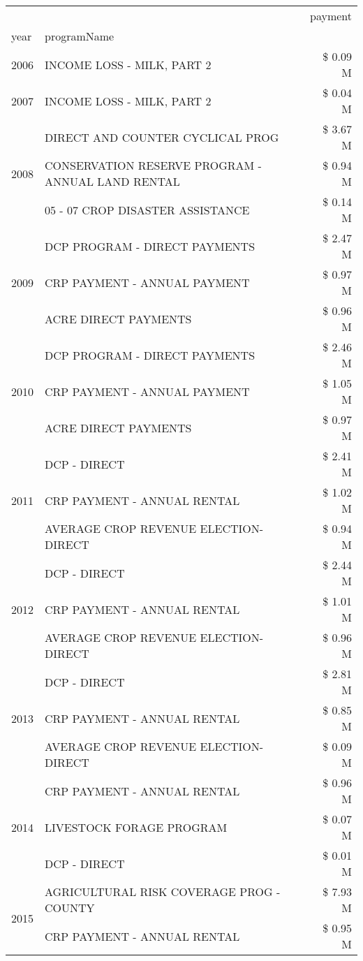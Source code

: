 \begin{tabular}{llr}
\toprule
 &  & payment \\
year & programName &  \\
\midrule
2006 & INCOME LOSS - MILK, PART 2 & \$ 0.09 M \\
\cline{1-3}
2007 & INCOME LOSS - MILK, PART 2 & \$ 0.04 M \\
\cline{1-3}
\multirow[t]{3}{*}{2008} & DIRECT AND COUNTER CYCLICAL PROG & \$ 3.67 M \\
 & CONSERVATION RESERVE PROGRAM - ANNUAL LAND RENTAL & \$ 0.94 M \\
 & 05 - 07 CROP DISASTER ASSISTANCE & \$ 0.14 M \\
\cline{1-3}
\multirow[t]{3}{*}{2009} & DCP PROGRAM - DIRECT PAYMENTS & \$ 2.47 M \\
 & CRP PAYMENT - ANNUAL PAYMENT & \$ 0.97 M \\
 & ACRE DIRECT PAYMENTS & \$ 0.96 M \\
\cline{1-3}
\multirow[t]{3}{*}{2010} & DCP PROGRAM - DIRECT PAYMENTS & \$ 2.46 M \\
 & CRP PAYMENT - ANNUAL PAYMENT & \$ 1.05 M \\
 & ACRE DIRECT PAYMENTS & \$ 0.97 M \\
\cline{1-3}
\multirow[t]{3}{*}{2011} & DCP - DIRECT & \$ 2.41 M \\
 & CRP PAYMENT - ANNUAL RENTAL & \$ 1.02 M \\
 & AVERAGE CROP REVENUE ELECTION-DIRECT & \$ 0.94 M \\
\cline{1-3}
\multirow[t]{3}{*}{2012} & DCP - DIRECT & \$ 2.44 M \\
 & CRP PAYMENT - ANNUAL RENTAL & \$ 1.01 M \\
 & AVERAGE CROP REVENUE ELECTION-DIRECT & \$ 0.96 M \\
\cline{1-3}
\multirow[t]{3}{*}{2013} & DCP - DIRECT & \$ 2.81 M \\
 & CRP PAYMENT - ANNUAL RENTAL & \$ 0.85 M \\
 & AVERAGE CROP REVENUE ELECTION-DIRECT & \$ 0.09 M \\
\cline{1-3}
\multirow[t]{3}{*}{2014} & CRP PAYMENT - ANNUAL RENTAL & \$ 0.96 M \\
 & LIVESTOCK FORAGE PROGRAM & \$ 0.07 M \\
 & DCP - DIRECT & \$ 0.01 M \\
\cline{1-3}
\multirow[t]{3}{*}{2015} & AGRICULTURAL RISK COVERAGE PROG - COUNTY & \$ 7.93 M \\
 & CRP PAYMENT - ANNUAL RENTAL & \$ 0.95 M \\

\end{tabular}
